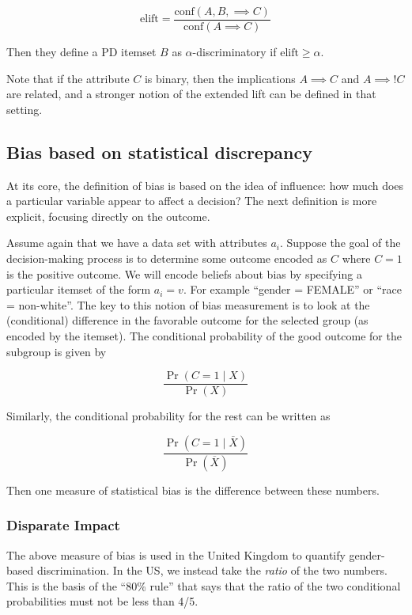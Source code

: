 \documentclass[11pt]{paper}
\begin{document}
\[ \text{elift} = \frac{\text{conf}(A, B, \implies C)}{\text{conf}(A \implies C)}\]

Then they define a PD itemset $B$ as $\alpha$-discriminatory if
$\text{elift} \ge \alpha$.

Note that if the attribute $C$ is binary, then the implications
$A \implies C$ and $A \implies !C$ are related, and a stronger notion of
the extended lift can be defined in that setting.

\subsection{Bias based on statistical
discrepancy}\label{bias-based-on-statistical-discrepancy}

At its core, the definition of bias is based on the idea of influence:
how much does a particular variable appear to affect a decision? The
next definition is more explicit, focusing directly on the outcome.

Assume again that we have a data set with attributes $a_i$. Suppose the
goal of the decision-making process is to determine some outcome encoded
as $C$ where $C =1$ is the positive outcome. We will encode beliefs
about bias by specifying a particular itemset of the form $a_i = v$. For
example ``gender = FEMALE'' or ``race = non-white''. The key to this
notion of bias measurement is to look at the (conditional) difference in
the favorable outcome for the selected group (as encoded by the
itemset). The conditional probability of the good outcome for the
subgroup is given by

\[ \frac{\Pr( C = 1 \mid X)}{\Pr(X)} \]

Similarly, the conditional probability for the rest can be written as

\[ \frac{\Pr( C = 1 \mid \overline{X})}{\Pr(\overline{X})} \]

Then one measure of statistical bias is the difference between these
numbers. \citep{kamiran_data_2012}

\subsubsection{Disparate Impact}\label{disparate-impact}

The above measure of bias is used in the United Kingdom to quantify
gender-based discrimination. In the US, we instead take the \emph{ratio}
of the two numbers. This is the basis of the ``80\% rule'' that says
that the ratio of the two conditional probabilities must not be less
than 4/5. \citep{feldman_certifying_2015}
\end{document}
